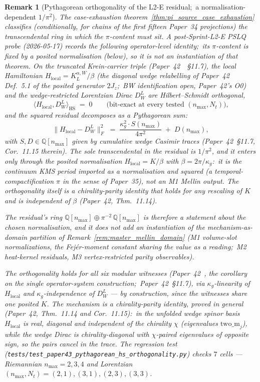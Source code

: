 \documentclass[11pt]{article}
\newtheorem{remark}{Remark}
\begin{document}
\begin{remark}[Pythagorean orthogonality of the L2-E residual;\ a normalisation-dependent $1/\pi^2$]
\label{rem:pythagorean_m1_closure}
The case-exhaustion theorem~\ref{thm:pi_source_case_exhaustion}
classifies (conditionally, for chains of the first fifteen Paper~34
projections) the transcendental ring in which the $\pi$-content must
sit.  A
post-Sprint-L2-E PSLQ probe (2026-05-17) records the following operator-level identity;\ its
$\pi$-content is fixed by a posited normalisation (below), so it is
\emph{not} an instantiation of that theorem.
On the truncated Krein-carrier triple
(Paper~42~\cite{paper42}~\S 11.7), the
local Hamiltonian
$H_{\mathrm{local}} = K^{\alpha, W}_L / \beta$ (the diagonal wedge
relabelling of Paper~42 Def.~5.1 of the posited generator $2J_z$;\
BW identification open, Paper~42's O0) and the
wedge-restricted Lorentzian Dirac $D_W^L$ are Hilbert--Schmidt
orthogonal,
\[
   \langle H_{\mathrm{local}}, D_W^L \rangle_{\mathrm{HS}}
   \;=\; 0
   \qquad \text{(bit-exact at every tested $(n_{\max}, N_t)$),}
\]
and the squared residual decomposes as a Pythagorean sum:
\[
   \big\| H_{\mathrm{local}} - D_W^L \big\|_F^2
   \;=\; \frac{\kappa_g^2 \cdot S(n_{\max})}{4\pi^2}
       \;+\; D(n_{\max}),
\]
with $S, D \in \mathbb{Q}[n_{\max}]$ given by cumulative wedge
Casimir traces (Paper~42~\S 11.7,
Cor.~11.15 therein).  The sole
transcendental in the residual is $1/\pi^2$,
and it enters \emph{only} through the posited normalisation
$H_{\mathrm{local}} = K/\beta$ with $\beta = 2\pi/\kappa_g$:\ it is the
continuum KMS period imported as a normalisation and squared (a
temporal-compactification $\pi$ in the sense of Paper~35), \emph{not}
an M1 Mellin output. The orthogonality itself is a chirality-parity
identity that holds for any rescaling of $K$ and is independent of
$\beta$ (Paper~42, Thm.~11.14).

The residual's ring $\mathbb{Q}[n_{\max}] \oplus
\pi^{-2}\,\mathbb{Q}[n_{\max}]$ is therefore a statement about the
chosen normalisation, and it does not add an instantiation of the
mechanism-as-domain partition of Remark~\ref{rem:master_mellin_domain}
(M1 volume-slot normalizations, the Fej\'er-moment constant sharing the value
as a reading;\ M2 heat-kernel residuals,
M3 vertex-restricted parity observables).

The orthogonality holds for all six modular witnesses
(Paper~42~\cite{paper42}, the corollary on the single operator-system construction;\
Paper~42~\S 11.7), via $\kappa_g$-linearity of $H_{\mathrm{local}}$
and $\kappa_g$-independence of $D_W^L$ --- by construction, since the
witnesses share one posited $K$.  The mechanism is a
chirality-parity identity, proved in general (Paper~42, Thm.~11.14 and
Cor.~11.15):\ in the unfolded wedge spinor basis $H_{\mathrm{local}}$
is real, diagonal and independent of the chirality $\chi$ (eigenvalues
$\mathrm{two\_m}_j$), while the wedge Dirac is chirality-diagonal with
$\chi$-paired eigenvalues of opposite sign, so the pairs cancel in the
trace.  The regression test
(\texttt{tests/test\_paper43\_pythagorean\_hs\_orthogonality.py}) checks
$7$ cells --- Riemannian $n_{\max} = 2, 3, 4$ and Lorentzian
$(n_{\max}, N_t) = (2,1), (3,1), (2,3), (3,3)$.


\end{remark}
\end{document}
